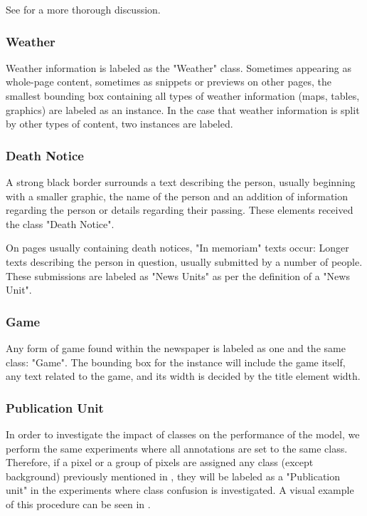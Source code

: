 \documentclass[oneside, english, bibtex]{kththesis}
\begin{document}
See  for a more thorough discussion.


\subsubsection{Weather}

Weather information is labeled as the "Weather" class.
Sometimes appearing as whole-page content, sometimes as snippets or previews on other pages, the smallest bounding box containing all types of weather information (maps, tables, graphics) are labeled as an instance.
In the case that weather information is split by other types of content, two instances are labeled.

\subsubsection{Death Notice}

A strong black border surrounds a text describing the person, usually beginning with a smaller graphic,
the name of the person and an addition of information regarding the person or details regarding their passing. These elements received the class "Death Notice".

On pages usually containing death notices, "In memoriam" texts occur: Longer texts describing the person in question, usually submitted by a number of people.
These submissions are labeled as "News Units" as per the definition of a "News Unit".

\subsubsection{Game}
\label{subsub:labelgame}

Any form of game found within the newspaper is labeled as one and the same class: "Game".
The bounding box for the instance will include the game itself, any text related to the game, and its width is decided by the title element width.


\subsubsection{Publication Unit}
\label{subs:pubunit}

In order to investigate the impact of classes on the performance of the model, we perform the same experiments where all annotations are set to the same class.
Therefore, if a pixel or a group of pixels are assigned any class (except background) previously mentioned in , they will be labeled as a "Publication unit" in the experiments where class confusion is investigated.
A visual example of this procedure can be seen in .
\end{document}
